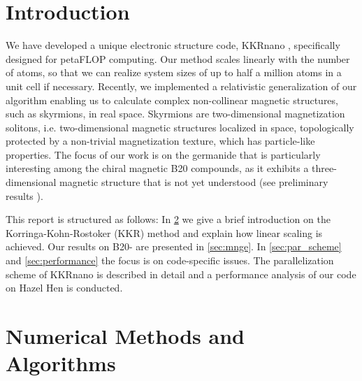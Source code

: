 \documentclass[graybox]{svmult}
\begin{document}
\section{Introduction}
\label{sec:intro}
We have developed a unique electronic structure code, 
KKRnano \cite{zeller_towards_2008,thiess_massively_2012},
specifically designed for petaFLOP computing. Our method scales linearly
with the number of atoms, so that we can realize system sizes of up to 
half a million atoms in a unit cell if necessary.
Recently, we implemented a relativistic generalization of our algorithm 
enabling us to calculate complex non-collinear magnetic structures, such as skyrmions,
in real space. Skyrmions are two-dimensional magnetization solitons, i.e. two-dimensional
magnetic structures localized in space, topologically protected by a non-trivial
magnetization texture, which has particle-like properties. 
The focus of our work is on the germanide  that is particularly
interesting among the chiral magnetic B20 compounds, as it exhibits a three-dimensional magnetic structure
that is not yet understood (see preliminary results
\cite{tanigaki_real-space_2015,rybakov_new_2016,bornemann_investigation_2017,bornemann_large-scale_2018}).

This report is structured as follows:
In \cref{sec:methods_algorithms} we give a brief introduction on the Korringa-Kohn-Rostoker (KKR) 
method and explain how
linear scaling is achieved.
Our results on B20- are presented in \cref{sec:mnge}.
In \cref{sec:par_scheme} and \cref{sec:performance} the focus is on code-specific issues. 
The parallelization scheme of KKRnano
is described in detail and a performance analysis of our code on Hazel Hen is conducted.


\section{Numerical Methods and Algorithms}
\label{sec:methods_algorithms}
 
\end{document}
